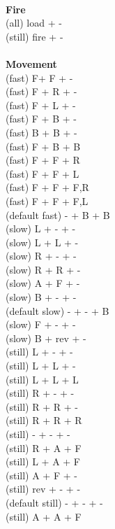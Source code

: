 \ \\ {\bf Fire } \\
(all) load + - \\
(still) fire + - \\
\ \\ {\bf Movement } \\
(fast) F+ F + - \\
(fast) F + R + - \\
(fast) F + L + - \\
(fast) F + B + - \\
(fast) B + B + - \\
(fast) F + B + B \\
(fast) F + F + R \\
(fast) F + F + L \\
(fast) F + F + F,R \\
(fast) F + F + F,L \\
(default fast) - + B + B \\
(slow) L + - + - \\
(slow) L + L + - \\
(slow) R + - + - \\
(slow) R + R + - \\
(slow) A + F + - \\
(slow) B + - + - \\
(default slow)  - + - + B \\
(slow) F + - + - \\
(slow) B + rev + - \\
(still) L + - + - \\
(still) L + L + - \\
(still) L + L + L \\
(still) R + - + - \\
(still) R + R + - \\
(still) R + R + R \\
(still) - + - + - \\
(still) R + A + F \\
(still) L + A + F \\
(still) A + F + - \\
(still) rev + - + - \\
(default still) - + - + - \\
(still) A + A + F \\



